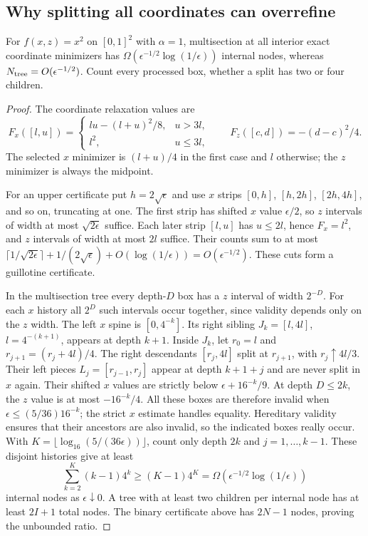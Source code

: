 \subsection{Why splitting all coordinates can overrefine}
\label{app:branching-multi}

\begin{proposition}
\label{branching:multi-separation}
For $f(x,z)=x^2$ on $[0,1]^2$ with $\alpha=1$, multisection at all
interior exact coordinate minimizers has
$\Omega(\epsilon^{-1/2}\log(1/\epsilon))$ internal nodes, whereas
$N_{\rm tree}=O(\epsilon^{-1/2})$. Count every processed box, whether
a split has two or four children.
\end{proposition}

\begin{proof}
The coordinate relaxation values are
\[
 F_x([l,u])=\begin{cases}lu-(l+u)^2/8,&u>3l,\\l^2,&u\le3l,
 \end{cases}\qquad F_z([c,d])=-(d-c)^2/4.
\]
The selected $x$ minimizer is $(l+u)/4$ in the first case and $l$
otherwise; the $z$ minimizer is always the midpoint.

For an upper certificate put $h=2\sqrt\epsilon$ and use $x$ strips
$[0,h]$, $[h,2h]$, $[2h,4h]$, and so on, truncating at one.
The first strip has shifted $x$ value $\epsilon/2$, so $z$ intervals
of width at most $\sqrt{2\epsilon}$ suffice. Each later strip
$[l,u]$ has $u\le2l$, hence $F_x=l^2$, and $z$ intervals of width
at most $2l$ suffice. Their counts sum to at most
$\lceil1/\sqrt{2\epsilon}\rceil+1/(2\sqrt\epsilon)
+O(\log(1/\epsilon))=O(\epsilon^{-1/2})$. These cuts form a
guillotine certificate.

In the multisection tree every depth-$D$ box has a $z$ interval of
width $2^{-D}$. For each $x$ history all $2^D$ such intervals occur
together, since validity depends only on the $z$ width.
The left $x$ spine is $[0,4^{-k}]$. Its right sibling
$J_k=[l,4l]$, $l=4^{-(k+1)}$, appears at depth $k+1$.
Inside $J_k$, let $r_0=l$ and $r_{j+1}=(r_j+4l)/4$.
The right descendants $[r_j,4l]$ split at $r_{j+1}$, with
$r_j\uparrow4l/3$. Their left pieces
$L_j=[r_{j-1},r_j]$ appear at depth $k+1+j$ and are never split
in $x$ again. Their shifted $x$ values are strictly below
$\epsilon+16^{-k}/9$. At depth $D\le2k$, the $z$ value is at most
$-16^{-k}/4$. All these boxes are therefore invalid when
$\epsilon\le(5/36)16^{-k}$; the strict $x$ estimate handles equality.
Hereditary validity ensures that their ancestors are also invalid, so
the indicated boxes really occur.
With $K=\lfloor\log_{16}(5/(36\epsilon))\rfloor$, count only depth
$2k$ and $j=1,\ldots,k-1$. These disjoint histories give at least
\[
 \sum_{k=2}^K(k-1)4^k\ge(K-1)4^K
       =\Omega(\epsilon^{-1/2}\log(1/\epsilon))
\]
internal nodes as $\epsilon\downarrow0$. A tree with at least two
children per internal node has at least $2I+1$ total nodes. The binary
certificate above has $2N-1$ nodes, proving the unbounded ratio.
\end{proof}


